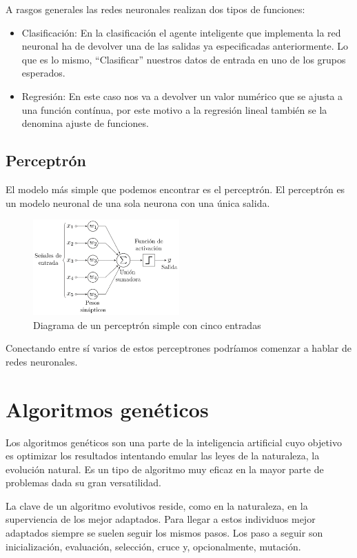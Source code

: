 A rasgos generales las redes neuronales realizan dos tipos de funciones:
\begin{itemize}
    \item Clasificación: En la clasificación el agente inteligente que implementa la red neuronal ha de devolver una de las salidas ya especificadas anteriormente. Lo que es lo mismo, ``Clasificar'' nuestros datos de entrada en uno de los grupos esperados.
    \item Regresión: En este caso nos va a devolver un valor numérico que se ajusta a una función contínua, por este motivo a la regresión lineal también se la denomina ajuste de funciones.
\end{itemize}


\subsection{Perceptrón}
\cite{wiki:perceptron}El modelo más simple que podemos encontrar es el perceptrón. El perceptrón es un modelo neuronal de una sola neurona con una única salida.
\begin{figure}[]
  \centering
  \includegraphics[width=0.5\textwidth]{../img/perceptron}\caption{Diagrama de un perceptrón simple con cinco entradas}
\end{figure}

Conectando entre sí varios de estos perceptrones podríamos comenzar a hablar de redes neuronales.


\section{Algoritmos genéticos}

\cite{AraujoCervigon} Los algoritmos genéticos son una parte de la inteligencia artificial cuyo objetivo es optimizar los resultados intentando emular las leyes de la naturaleza, la evolución natural. Es un tipo de algoritmo muy eficaz en la mayor parte de problemas dada su gran versatilidad.

\cite{JHolland}La clave de un algoritmo evolutivos reside, como en la naturaleza, en la superviencia de los mejor adaptados. Para llegar a estos individuos mejor adaptados siempre se suelen seguir los mismos pasos. Los paso a seguir son inicialización, evaluación, selección, cruce y, opcionalmente, mutación.


